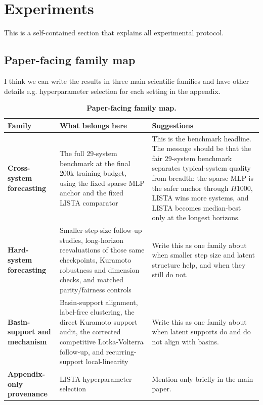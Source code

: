 \section{Experiments}
\label{sec:experiments}

This is a self-contained section that explains all experimental protocol.

\subsection{Paper-facing family map}

I think we can write the results in three main scientific families and have other details e.g. hyperparameter selection for each setting in the appendix.

\begin{table}[ht!]
\centering
\footnotesize
\setlength{\tabcolsep}{4pt}
\begin{tabular}{p{}p{}p{}}
\toprule
Family & What belongs here & Suggestions \\
\midrule
\textbf{Cross-system forecasting} &
The full 29-system benchmark at the final 200k training budget, using the fixed sparse MLP anchor and the fixed LISTA comparator &
This is the benchmark headline. The message should be that the fair 29-system benchmark separates typical-system quality from breadth: the sparse MLP is the safer anchor through $H1000$, LISTA wins more systems, and LISTA becomes median-best only at the longest horizons. \\
\textbf{Hard-system forecasting} &
Smaller-step-size follow-up studies, long-horizon reevaluations of those same checkpoints, Kuramoto robustness and dimension checks, and matched parity/fairness controls &
Write this as one family about when smaller step size and latent structure help, and when they still do not. \\
\textbf{Basin-support and mechanism} &
Basin-support alignment, label-free clustering, the direct Kuramoto support audit, the corrected competitive Lotka-Volterra follow-up, and recurring-support local-linearity &
Write this as one family about when latent supports do and do not align with basins. \\
\textbf{Appendix-only provenance} & LISTA hyperparameter selection &
Mention only briefly in the main paper.\\
\bottomrule
\end{tabular}
\caption{\textbf{Paper-facing family map.}}
\label{tab:review-family-map-20260314}
\end{table}

